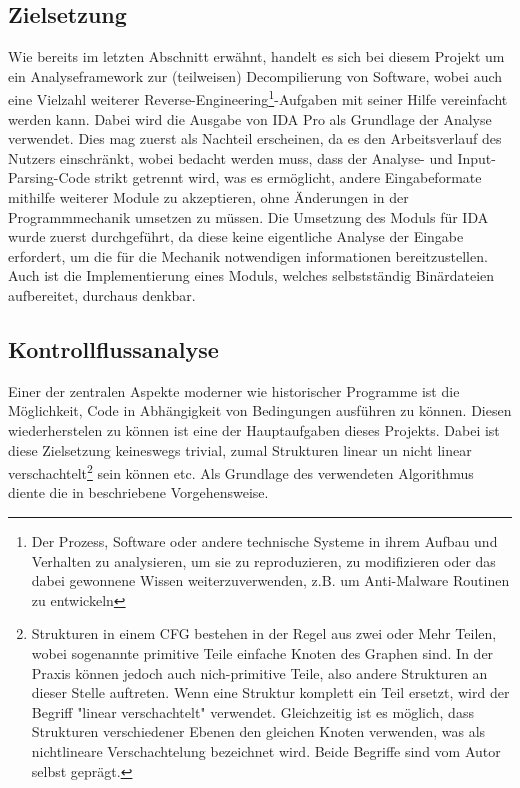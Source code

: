 \documentclass[11pt]{article} %
\begin{document}
\begin{multicols}{2}
\section{Zielsetzung}
Wie bereits im letzten Abschnitt erwähnt, handelt es sich bei diesem Projekt um ein Analyseframework zur (teilweisen) Decompilierung von Software, wobei auch eine Vielzahl weiterer Reverse-Engineering\footnote{Der Prozess, Software oder andere technische Systeme in ihrem Aufbau und Verhalten zu analysieren, um sie zu reproduzieren, zu modifizieren oder das dabei gewonnene Wissen weiterzuverwenden, z.B. um Anti-Malware Routinen zu entwickeln}-Aufgaben mit seiner Hilfe vereinfacht werden kann. Dabei wird die Ausgabe von IDA Pro als Grundlage der Analyse verwendet. Dies mag zuerst als Nachteil erscheinen, da es den Arbeitsverlauf des Nutzers einschränkt, wobei bedacht werden muss, dass der Analyse- und Input-Parsing-Code strikt getrennt wird, was es ermöglicht, andere Eingabeformate mithilfe weiterer Module zu akzeptieren, ohne Änderungen in der Programmmechanik umsetzen zu müssen. Die Umsetzung des Moduls für IDA wurde zuerst durchgeführt, da diese keine eigentliche Analyse der Eingabe erfordert, um die für die Mechanik notwendigen informationen bereitzustellen. Auch ist die Implementierung eines Moduls, welches selbstständig Binärdateien aufbereitet, durchaus denkbar.

\subsection{Kontrollflussanalyse}
\label{sec:CFA}
Einer der zentralen Aspekte moderner wie historischer Programme ist die Möglichkeit, Code in Abhängigkeit von Bedingungen ausführen zu können. Diesen wiederherstelen zu können ist eine der Hauptaufgaben dieses Projekts. Dabei ist diese Zielsetzung keineswegs trivial, zumal Strukturen linear un nicht linear verschachtelt\footnote{Strukturen in einem CFG bestehen in der Regel aus zwei oder Mehr Teilen, wobei sogenannte primitive Teile einfache Knoten des Graphen sind. In der Praxis können jedoch auch nich-primitive Teile, also andere Strukturen an dieser Stelle auftreten. Wenn eine Struktur komplett ein Teil ersetzt, wird der Begriff "linear verschachtelt" verwendet. Gleichzeitig ist es möglich, dass Strukturen verschiedener Ebenen den gleichen Knoten verwenden, was als nichtlineare Verschachtelung bezeichnet wird. Beide Begriffe sind vom Autor selbst geprägt.} sein können etc. Als Grundlage des verwendeten Algorithmus diente die in \cite{structural_analysis:1} beschriebene Vorgehensweise.


\end{multicols}
\end{document}
